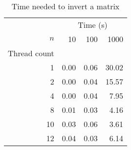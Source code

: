 \documentclass[a4paper]{article}
\begin{document}
\begin{table}
	\centering
	\caption{Time needed to invert a matrix}
	\label{tbl:invert}
	\begin{tabular}{r|r|r|r}
		& \multicolumn{3}{c}{Time (s)} \\
		$n$ & 10 & 100 & 1000 \\ \hline
		Thread count \\ \cline{2-4}
		 1 & 0.00 & 0.06 & 30.02 \\
		 2 & 0.00 & 0.04 & 15.57 \\
		 4 & 0.00 & 0.04 & 7.95 \\
		 8 & 0.01 & 0.03 & 4.16 \\
		10 & 0.03 & 0.06 & 3.61 \\
		12 & 0.04 & 0.03 & 6.14 \\
	\end{tabular}
\end{table}
\end{document}
